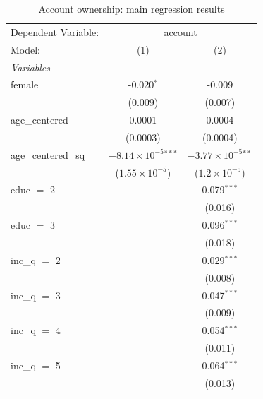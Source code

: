 
\begin{table}[htbp]
   \caption{\label{tab:main_regressions} Account ownership: main regression results}
   \centering
   \begin{tabular}{lcc}
      \tabularnewline \midrule \midrule
      Dependent Variable: & \multicolumn{2}{c}{account}\\
      Model:              & (1)                            & (2)\\  
      \midrule
      \emph{Variables}\\
      female              & -0.020$^{*}$                   & -0.009\\   
                          & (0.009)                        & (0.007)\\   
      age\_centered       & 0.0001                         & 0.0004\\   
                          & (0.0003)                       & (0.0004)\\   
      age\_centered\_sq   & $-8.14\times 10^{-5}$$^{***}$  & $-3.77\times 10^{-5}$$^{**}$\\    
                          & ($1.55\times 10^{-5}$)         & ($1.2\times 10^{-5}$)\\    
      educ $=$ 2          &                                & 0.079$^{***}$\\   
                          &                                & (0.016)\\   
      educ $=$ 3          &                                & 0.096$^{***}$\\   
                          &                                & (0.018)\\   
      inc\_q $=$ 2        &                                & 0.029$^{***}$\\   
                          &                                & (0.008)\\   
      inc\_q $=$ 3        &                                & 0.047$^{***}$\\   
                          &                                & (0.009)\\   
      inc\_q $=$ 4        &                                & 0.054$^{***}$\\   
                          &                                & (0.011)\\   
      inc\_q $=$ 5        &                                & 0.064$^{***}$\\   
                          &                                & (0.013)\\   

\end{tabular}
\end{table}
